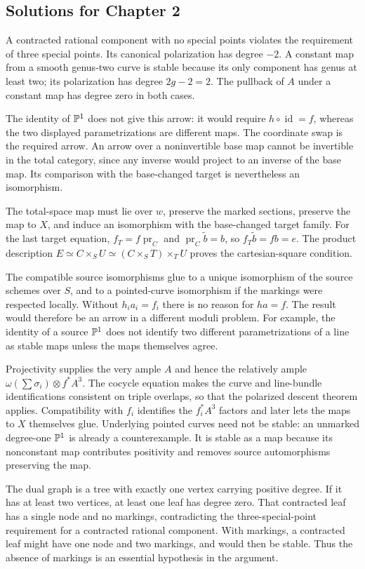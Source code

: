 \subsection*{Solutions for Chapter 2}

A contracted rational component with no special points violates the requirement of three special points. Its canonical polarization has degree $-2$. A constant map from a smooth genus-two curve is stable because its only component has genus at least two; its polarization has degree $2g-2=2$. The pullback of $A$ under a constant map has degree zero in both cases.

\medskip
{}
The identity of $\mathbb P^1$ does not give this arrow: it would require $h\circ\operatorname{id}=f$, whereas the two displayed parametrizations are different maps. The coordinate swap is the required arrow. An arrow over a noninvertible base map cannot be invertible in the total category, since any inverse would project to an inverse of the base map. Its comparison with the base-changed target is nevertheless an isomorphism.

\medskip
{}
The total-space map must lie over $w$, preserve the marked sections, preserve the map to $X$, and induce an isomorphism with the base-changed target family. For the last target equation, $f_T=f\operatorname{pr}_C$ and $\operatorname{pr}_C\widetilde b=b$, so $f_T\widetilde b=fb=e$. The product description $E\simeq C\times_S U\simeq(C\times_S T)\times_T U$ proves the cartesian-square condition.

\medskip
{}
The compatible source isomorphisms glue to a unique isomorphism of the source schemes over $S$, and to a pointed-curve isomorphism if the markings were respected locally. Without $h_i a_i=f_i$ there is no reason for $ha=f$. The result would therefore be an arrow in a different moduli problem. For example, the identity of a source $\mathbb P^1$ does not identify two different parametrizations of a line as stable maps unless the maps themselves agree.

\medskip
{}
Projectivity supplies the very ample $A$ and hence the relatively ample $\omega(\sum\sigma_i)\otimes f^*A^3$. The cocycle equation makes the curve and line-bundle identifications consistent on triple overlaps, so that the polarized descent theorem applies. Compatibility with $f_i$ identifies the $f_i^*A^3$ factors and later lets the maps to $X$ themselves glue. Underlying pointed curves need not be stable: an unmarked degree-one $\mathbb P^1$ is already a counterexample. It is stable as a map because its nonconstant map contributes positivity and removes source automorphisms preserving the map.

\medskip
{}
The dual graph is a tree with exactly one vertex carrying positive degree. If it has at least two vertices, at least one leaf has degree zero. That contracted leaf has a single node and no markings, contradicting the three-special-point requirement for a contracted rational component. With markings, a contracted leaf might have one node and two markings, and would then be stable. Thus the absence of markings is an essential hypothesis in the argument.
